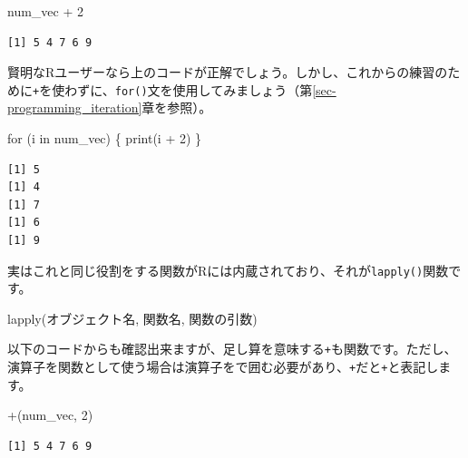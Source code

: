\documentclass[
  a4paper,
  pandoc,
  ja=standard,
  jafont=haranoaji]{bxjsbook}
\newenvironment{Shaded}{\begin{snugshade}}{\end{snugshade}}
\newcommand{\AttributeTok}[1]{\textcolor[rgb]{0.00,0.48,0.65}{#1}}
\newcommand{\ControlFlowTok}[1]{\textcolor[rgb]{0.00,0.48,0.65}{#1}}
\newcommand{\DecValTok}[1]{\textcolor[rgb]{0.68,0.00,0.00}{#1}}
\newcommand{\FunctionTok}[1]{\textcolor[rgb]{0.28,0.35,0.67}{#1}}
\newcommand{\NormalTok}[1]{\textcolor[rgb]{0.00,0.48,0.65}{#1}}
\newcommand{\SpecialCharTok}[1]{\textcolor[rgb]{0.37,0.37,0.37}{#1}}
\newcommand{\StringTok}[1]{\textcolor[rgb]{0.13,0.47,0.30}{#1}}
\begin{document}
\begin{Shaded}
\begin{Highlighting}[numbers=left,,]
\NormalTok{num\_vec }\SpecialCharTok{+} \DecValTok{2}
\end{Highlighting}
\end{Shaded}

\begin{verbatim}
[1] 5 4 7 6 9
\end{verbatim}

賢明なRユーザーなら上のコードが正解でしょう。しかし、これからの練習のために\texttt{+}を使わずに、\texttt{for()}文を使用してみましょう（第\ref{sec-programming_iteration}章を参照）。

\begin{Shaded}
\begin{Highlighting}[numbers=left,,]
\ControlFlowTok{for}\NormalTok{ (i }\ControlFlowTok{in}\NormalTok{ num\_vec) \{}
    \FunctionTok{print}\NormalTok{(i }\SpecialCharTok{+} \DecValTok{2}\NormalTok{)}
\NormalTok{\}}
\end{Highlighting}
\end{Shaded}

\begin{verbatim}
[1] 5
[1] 4
[1] 7
[1] 6
[1] 9
\end{verbatim}

実はこれと同じ役割をする関数がRには内蔵されており、それが\texttt{lapply()}関数です。

\begin{Shaded}
\begin{Highlighting}[numbers=left,,]
\FunctionTok{lapply}\NormalTok{(オブジェクト名, 関数名, 関数の引数)}
\end{Highlighting}
\end{Shaded}

以下のコードからも確認出来ますが、足し算を意味する\texttt{+}も関数です。ただし、演算子を関数として使う場合は演算子を\texttt{\textasciigrave{}}で囲む必要があり、\texttt{+}だと\texttt{\textasciigrave{}+\textasciigrave{}}と表記します。

\begin{Shaded}
\begin{Highlighting}[numbers=left,,]
\StringTok{\textasciigrave{}}\AttributeTok{+}\StringTok{\textasciigrave{}}\NormalTok{(num\_vec, }\DecValTok{2}\NormalTok{)}
\end{Highlighting}
\end{Shaded}

\begin{verbatim}
[1] 5 4 7 6 9
\end{verbatim}
\end{document}
